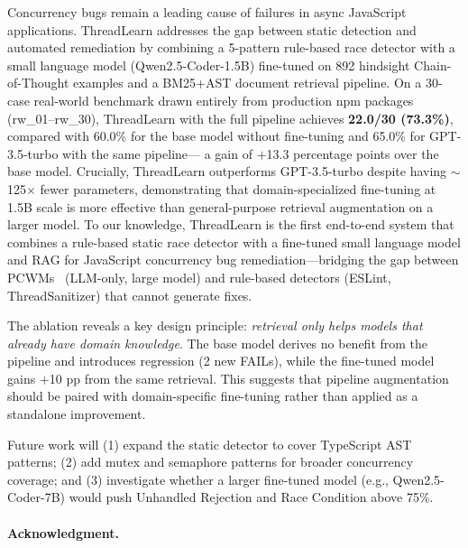 \documentclass[runningheads]{llncs}
\begin{document}
Concurrency bugs remain a leading cause of failures in async JavaScript
applications.
ThreadLearn addresses the gap between static detection and automated
remediation by combining a 5-pattern rule-based race detector with a
small language model (Qwen2.5-Coder-1.5B) fine-tuned on 892 hindsight
Chain-of-Thought examples and a BM25+AST document retrieval pipeline.
On a 30-case real-world benchmark drawn entirely from production npm
packages (rw\_01--rw\_30), ThreadLearn with the full pipeline achieves
\textbf{22.0/30 (73.3\%)}, compared with 60.0\% for the base model
without fine-tuning and 65.0\% for GPT-3.5-turbo with the same pipeline---
a gain of $+$13.3 percentage points over the base model.
Crucially, ThreadLearn outperforms GPT-3.5-turbo despite having $\sim$125$\times$
fewer parameters, demonstrating that domain-specialized fine-tuning at
1.5B scale is more effective than general-purpose retrieval augmentation
on a larger model.
To our knowledge, ThreadLearn is the first end-to-end system that combines
a rule-based static race detector with a fine-tuned small language model
and RAG for JavaScript concurrency bug remediation---bridging the gap
between PCWMs~\cite{pcwms2026} (LLM-only, large model) and rule-based
detectors (ESLint, ThreadSanitizer) that cannot generate fixes.

The ablation reveals a key design principle: \emph{retrieval only helps
models that already have domain knowledge}.
The base model derives no benefit from the pipeline and introduces regression
(2 new FAILs), while the fine-tuned model gains $+$10 pp from the same
retrieval.
This suggests that pipeline augmentation should be paired with
domain-specific fine-tuning rather than applied as a standalone improvement.

Future work will (1) expand the static detector to cover TypeScript AST
patterns; (2) add mutex and semaphore patterns for broader concurrency
coverage; and (3) investigate whether a larger fine-tuned model
(e.g., Qwen2.5-Coder-7B) would push Unhandled Rejection and Race Condition
above 75\%.

\paragraph{Acknowledgment.}
\end{document}
